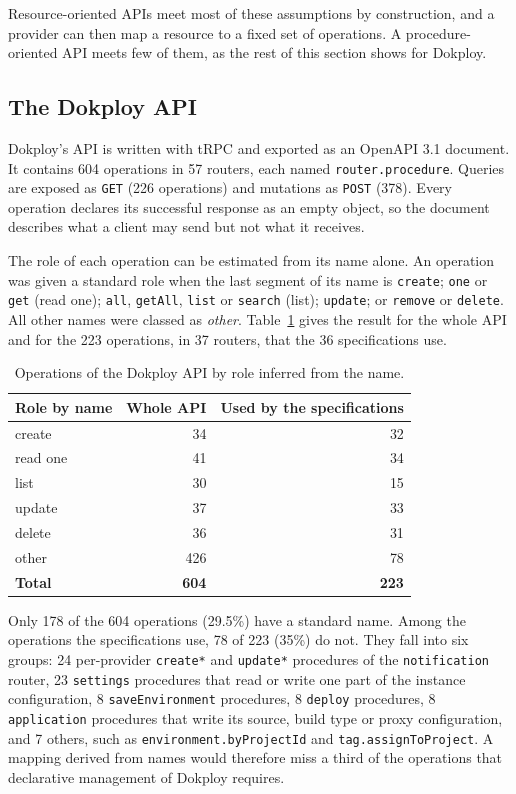 Resource-oriented APIs meet most of these assumptions by construction, and a provider can then map a
resource to a fixed set of operations. A procedure-oriented API meets few of them, as the rest of this
section shows for Dokploy.

\subsection{The Dokploy API}\label{sec:3.2}

Dokploy's API is written with tRPC and exported as an OpenAPI 3.1 document. It contains 604 operations
in 57 routers, each named \texttt{router.procedure}. Queries are exposed as \texttt{GET} (226 operations) and
mutations as \texttt{POST} (378). Every operation declares its successful response as an empty object, so
the document describes what a client may send but not what it receives.

The role of each operation can be estimated from its name alone. An operation was given a standard
role when the last segment of its name is \texttt{create}; \texttt{one} or \texttt{get} (read one); \texttt{all}, \texttt{getAll}, \texttt{list}
or \texttt{search} (list); \texttt{update}; or \texttt{remove} or \texttt{delete}. All other names were classed as \emph{other}. Table~\ref{tab:2}
gives the result for the whole API and for the 223 operations, in 37 routers, that the 36
specifications use.

\begin{table}[tbp]
\centering
\small
\caption{Operations of the Dokploy API by role inferred from the name.}
\label{tab:2}
\begin{tabular}{lrr}
\toprule
Role by name & Whole API & Used by the specifications \\
\midrule
create & 34 & 32 \\
read one & 41 & 34 \\
list & 30 & 15 \\
update & 37 & 33 \\
delete & 36 & 31 \\
other & 426 & 78 \\
\textbf{Total} & \textbf{604} & \textbf{223} \\
\bottomrule
\end{tabular}
\end{table}

Only 178 of the 604 operations (29.5\%) have a standard name. Among the operations the specifications
use, 78 of 223 (35\%) do not. They fall into six groups: 24 per-provider \texttt{create*} and \texttt{update*}
procedures of the \texttt{notification} router, 23 \texttt{settings} procedures that read or write one part of the
instance configuration, 8 \texttt{saveEnvironment} procedures, 8 \texttt{deploy} procedures, 8 \texttt{application}
procedures that write its source, build type or proxy configuration, and 7 others, such as
\texttt{environment.byProjectId} and \texttt{tag.assignToProject}. A mapping derived from names would therefore miss
a third of the operations that declarative management of Dokploy requires.


